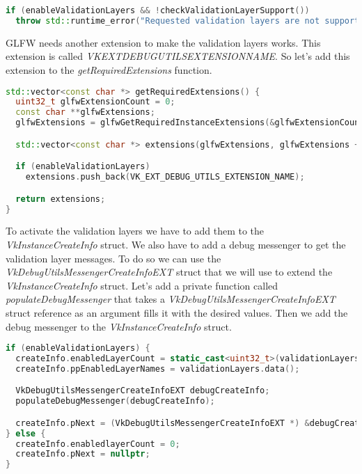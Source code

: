 \documentclass[12pt]{report} \usepackage{preamble}
\begin{document}
\newpage

\begin{lstlisting}[language=C++]
if (enableValidationLayers && !checkValidationLayerSupport())
  throw std::runtime_error("Requested validation layers are not supported!");
\end{lstlisting}

\ac{GLFW} needs another extension to make the validation layers works. This extension is called
\textit{VK\textunderscore EXT\textunderscore DEBUG\textunderscore UTILS\textunderscore EXTENSION\textunderscore NAME}.
So let's add this extension to the \textit{getRequiredExtensions} function.

\begin{lstlisting}[language=C++]
std::vector<const char *> getRequiredExtensions() {
  uint32_t glfwExtensionCount = 0;
  const char **glfwExtensions;
  glfwExtensions = glfwGetRequiredInstanceExtensions(&glfwExtensionCount);

  std::vector<const char *> extensions(glfwExtensions, glfwExtensions + glfwExtensionCount);

  if (enableValidationLayers)
    extensions.push_back(VK_EXT_DEBUG_UTILS_EXTENSION_NAME);

  return extensions;
}
\end{lstlisting}

To activate the validation layers we have to add them to the \textit{VkInstanceCreateInfo} struct.
We also have to add a debug messenger to get the validation layer messages. To do so we can
use the \textit{VkDebugUtilsMessengerCreateInfoEXT} struct that we will use to extend the
\textit{VkInstanceCreateInfo} struct. Let's add a private function called \textit{populateDebugMessenger}
that takes a \textit{VkDebugUtilsMessengerCreateInfoEXT} struct reference as an argument fills it with
the desired values. Then we add the debug messenger to the \textit{VkInstanceCreateInfo} struct.

\newpage

\begin{lstlisting}[language=C++]
if (enableValidationLayers) {
  createInfo.enabledLayerCount = static_cast<uint32_t>(validationLayers.size());
  createInfo.ppEnabledLayerNames = validationLayers.data();

  VkDebugUtilsMessengerCreateInfoEXT debugCreateInfo;
  populateDebugMessenger(debugCreateInfo);

  createInfo.pNext = (VkDebugUtilsMessengerCreateInfoEXT *) &debugCreateInfo;
} else {
  createInfo.enabledlayerCount = 0;
  createInfo.pNext = nullptr;
}
\end{lstlisting}
\end{document}
